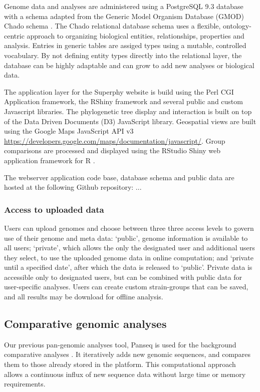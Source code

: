 \documentclass{bmcart}
\begin{document}
Genome data and analyses are administered using a PostgreSQL 9.3 database with a schema adapted from the Generic Model Organism Database (GMOD) Chado schema \cite{mungall_chado_2007}. The Chado relational database schema uses a flexible, ontology-centric approach to organizing biological entities, relationships, properties and analysis. Entries in generic tables are assiged types using a mutable, controlled vocabulary. By not defining entity types directly into the relational layer, the database can be highly adaptable and can grow to add new analyses or biological data.

The application layer for the Superphy website is build using the Perl CGI Application framework, the RShiny framework and several public and custom Javascript libraries. The phylogenetic tree display and interaction is built on top of the Data Driven Documents (D3) JavaScript library. Geospatial views are built using the Google Maps JavaScript API v3 \url{https://developers.google.com/maps/documentation/javascript/}. Group comparisons are processed and displayed using the RStudio Shiny web application framework for R \cite{racine_rstudio:_2012}.

The webserver application code base, database schema and public data are hosted at the following Github repository: ...

\subsubsection{Access to uploaded data}
Users can upload genomes and choose between three three access levels to govern use of their genome and meta data: `public', genome information is available to all users; `private', which allows the only the designated user and additional users they select, to use the uploaded genome data in online computation; and `private until a specified date', after which the data is released to `public'. Private data is accessible only to designated users, but can be combined with public data for user-specific analyses. Users can create custom strain-groups that can be saved, and all results may be download for offline analysis.

\subsection{Comparative genomic analyses}
Our previous pan-genomic analyses tool, Panseq is used for the background comparative analyses \cite{laing_pan-genome_2010}. It iteratively adds new genomic sequences, and compares them to those already stored in the platform. This computational approach allows a continuous influx of new sequence data without large time or memory requirements. 
\end{document}
